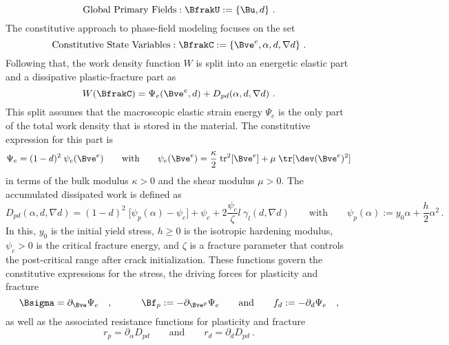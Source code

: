 \documentclass[final,3p,times]{elsarticle}
\begin{document}
% 
\begin{equation}
\mbox{Global Primary Fields}: \BfrakU := \{ \Bu, d \}
\label{global-fields}
\ .
\end{equation}
%
The constitutive approach to phase-field modeling focuses on the set
\begin{equation}
\mbox{Constitutive State Variables}: 
	\BfrakC := \{ \Bve^e, \alpha, d, \nabla d \}
\ .
\label{state}
\end{equation}
%
Following that, the work density function $W$ is split into an energetic elastic part and a dissipative plastic-fracture part as
\begin{equation}
{W}(\BfrakC) = 
{\Psi}_{e}(\Bve^e, d) + {D}{}_{pd} (\alpha, d, \nabla d) \ .
\label{pseudo-energy}
\end{equation}
%
This split assumes that the macroscopic elastic strain energy $\Psi_e$ is the only part of the total work density that is stored in the material. The constitutive expression for this part is
\begin{equation}
\Psi_e = (1-d)^2 \; \psi_e(\Bve^e) 
\qquad \mbox{with} \qquad
\psi_e(\Bve^e) = \frac{\kappa}{2}\; \mbox{tr}^2[\Bve^e] + \mu\;\tr [\dev(\Bve^e)^2]
\label{elas-part}
\end{equation}
in terms of the bulk modulus $\kappa > 0$ and the shear modulus $\mu > 0$. The accumulated dissipated work is defined as
\begin{equation}
{D}{}_{pd} (\alpha, d, \nabla d) = (1-d)^2 \; \big[ \psi_p(\alpha) - \psi_c \big] + \psi_c + 2 \frac{\psi_c}{\zeta} l~ {\gamma_l}(d, \nabla d)
\qquad \mbox{with} \qquad
\psi_p(\alpha) := y_0 \alpha + \frac{h}{2} \alpha^2\,.
\end{equation}
In this, $y_0$ is the initial yield stress, $h\ge 0$ is the isotropic hardening modulus, ${\psi}_c > 0$ is the critical fracture energy, and $\zeta$ is a fracture parameter that controls the post-critical range after crack initialization. These functions govern the constitutive expressions for the stress, the driving forces for plasticity and fracture
%
\begin{equation}
\Bsigma = \partial_{\Bve} {\Psi}{}_e \quad ,
\quad  \qquad
\Bf_p := - \partial_{\Bve^p} {\Psi}{}_e
\qquad \mbox{and} \qquad
f_d := - \partial_{d} {\Psi}{}_e \quad  ,
\label{stress-driving-forces}
\end{equation}
as well as the associated resistance functions for plasticity and fracture
%
\begin{equation}
r_p = \partial_{\alpha} {D}{}_{pd}
\qquad \mbox{and} \qquad
r_d = \partial_{d} {D}{}_{pd} \ .
\end{equation}
\end{document}
